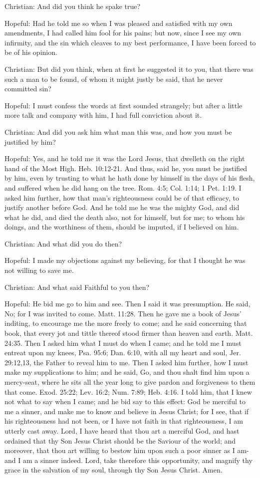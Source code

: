 Christian: And did you think he spake true?

Hopeful: Had he told me so when I was pleased and satisfied with my own
amendments, I had called him fool for his pains; but now, since I see
my own infirmity, and the sin which cleaves to my best performance, I
have been forced to be of his opinion.

Christian: But did you think, when at first he suggested it to you,
that there was such a man to be found, of whom it might justly be said,
that he never committed sin?

Hopeful: I must confess the words at first sounded strangely; but after
a little more talk and company with him, I had full conviction about
it.

Christian: And did you ask him what man this was, and how you must be
justified by him?

Hopeful: Yes, and he told me it was the Lord Jesus, that dwelleth on
the right hand of the Most High. Heb. 10:12-21. And thus, said he, you
must be justified by him, even by trusting to what he hath done by
himself in the days of his flesh, and suffered when he did hang on the
tree. Rom. 4:5; Col. 1:14; 1 Pet. 1:19. I asked him further, how that
man's righteousness could be of that efficacy, to justify another
before God. And he told me he was the mighty God, and did what he did,
and died the death also, not for himself, but for me; to whom his
doings, and the worthiness of them, should be imputed, if I believed on
him.

Christian: And what did you do then?

Hopeful: I made my objections against my believing, for that I thought
he was not willing to save me.

Christian: And what said Faithful to you then?

Hopeful: He bid me go to him and see. Then I said it was presumption.
He said, No; for I was invited to come. Matt. 11:28. Then he gave me a
book of Jesus' inditing, to encourage me the more freely to come; and
he said concerning that book, that every jot and tittle thereof stood
firmer than heaven and earth. Matt. 24:35. Then I asked him what I must
do when I came; and he told me I must entreat upon my knees, Psa. 95:6;
Dan. 6:10, with all my heart and soul, Jer. 29:12,13, the Father to
reveal him to me. Then I asked him further, how I must make my
supplications to him; and he said, Go, and thou shalt find him upon a
mercy-seat, where he sits all the year long to give pardon and
forgiveness to them that come. Exod. 25:22; Lev. 16:2; Num. 7:89; Heb.
4:16. I told him, that I knew not what to say when I came; and he bid
say to this effect: God be merciful to me a sinner, and make me to know
and believe in Jesus Christ; for I see, that if his righteousness had
not been, or I have not faith in that righteousness, I am utterly cast
away. Lord, I have heard that thou art a merciful God, and hast
ordained that thy Son Jesus Christ should be the Saviour of the world;
and moreover, that thou art willing to bestow him upon such a poor
sinner as I am-and I am a sinner indeed. Lord, take therefore this
opportunity, and magnify thy grace in the salvation of my soul, through
thy Son Jesus Christ. Amen.

